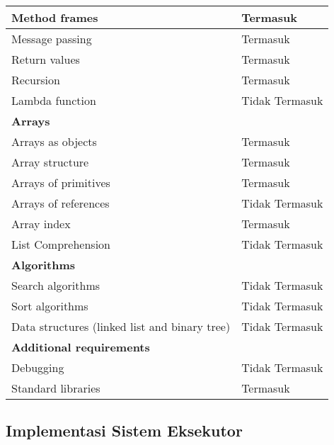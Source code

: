 \begin{longtable}[c]{|l|l|}
  Method frames                                 & Termasuk                      \\ \hline
  Message passing                               & Termasuk                      \\ \hline
  Return values                                 & Termasuk                      \\ \hline
  Recursion                                     & Termasuk                      \\ \hline
  Lambda function                               & Tidak Termasuk                \\ \hline
  \textbf{Arrays}                               &                               \\ \hline
  Arrays as objects                             & Termasuk                      \\ \hline
  Array structure                               & Termasuk                      \\ \hline
  Arrays of primitives                          & Termasuk                      \\ \hline
  Arrays of references                          & Tidak Termasuk                \\ \hline
  Array index                                   & Termasuk                      \\ \hline
  List Comprehension                            & Tidak Termasuk                \\ \hline
  \textbf{Algorithms}                           &                               \\ \hline
  Search algorithms                             & Tidak Termasuk                \\ \hline
  Sort algorithms                               & Tidak Termasuk                \\ \hline
  Data structures (linked list and binary tree) & Tidak Termasuk                \\ \hline
  \textbf{Additional requirements}              &                               \\ \hline
  Debugging                                     & Tidak Termasuk                \\ \hline
  Standard libraries                            & Termasuk                      \\ \hline
\end{longtable}
\normalsize

\subsection{Implementasi Sistem Eksekutor}

